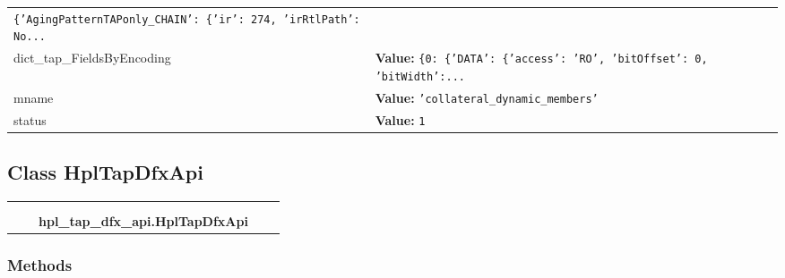 \begin{longtable}{|p{\varnamewidth}|p{\vardescrwidth}|l}
{\tt \texttt{\{}\texttt{'}\texttt{AgingPatternTAPonly\_CHAIN}\texttt{'}\texttt{: }\texttt{\{}\texttt{'}\texttt{ir}\texttt{'}\texttt{: }274\texttt{, }\texttt{'}\texttt{irRtlPath}\texttt{'}\texttt{: }No\texttt{...}}&\\
\cline{1-2}
\raggedright d\-i\-c\-t\-\_\-t\-a\-p\-\_\-F\-i\-e\-l\-d\-s\-B\-y\-E\-n\-c\-o\-d\-i\-n\-g\- & \raggedright \textbf{Value:} 
{\tt \texttt{\{}0\texttt{: }\texttt{\{}\texttt{'}\texttt{DATA}\texttt{'}\texttt{: }\texttt{\{}\texttt{'}\texttt{access}\texttt{'}\texttt{: }\texttt{'}\texttt{RO}\texttt{'}\texttt{, }\texttt{'}\texttt{bitOffset}\texttt{'}\texttt{: }0\texttt{, }\texttt{'}\texttt{bitWidth}\texttt{'}\texttt{:}\texttt{...}}&\\
\cline{1-2}
\raggedright m\-n\-a\-m\-e\- & \raggedright \textbf{Value:} 
{\tt \texttt{'}\texttt{collateral\_dynamic\_members}\texttt{'}}&\\
\cline{1-2}
\raggedright s\-t\-a\-t\-u\-s\- & \raggedright \textbf{Value:} 
{\tt 1}&\\
\cline{1-2}
\end{longtable}



\subsection{Class HplTapDfxApi}

    \label{hpl_tap_dfx_api:HplTapDfxApi}
\begin{tabular}{cccccc}
\multicolumn{2}{r}{\settowidth{\BCL}{object}\multirow{2}{\BCL}{object}}
&&
  \\\cline{3-3}
  &&\multicolumn{1}{c|}{}
&&
  \\
&&\multicolumn{2}{l}{\textbf{hpl\_tap\_dfx\_api.HplTapDfxApi}}
\end{tabular}



  \subsubsection{Methods}

